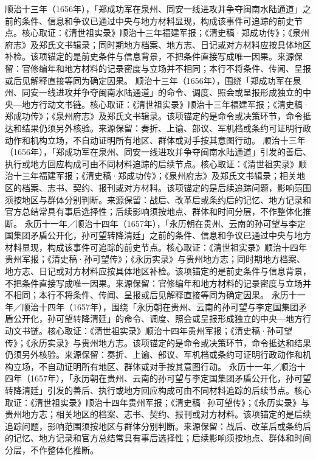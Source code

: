 顺治十三年（1656年），「郑成功军在泉州、同安一线进攻并争夺闽南水陆通道」之前的条件、信息和争议已通过中央与地方材料显现，构成该事件可追踪的前史节点。核心取证：《清世祖实录》顺治十三年福建军报；《清史稿·郑成功传》；《泉州府志》及郑氏文书辑录；同时期地方档案、地方志、日记或对方材料应按具体地区补检。该项锚定的是前史条件与信息背景，不把条件直接写成唯一因果。来源保留：官修编年和地方材料的记录密度与立场并不相同；本行不将条件、传闻、呈报或后见解释直接等同为确定因果。
顺治十三年（1656年），围绕「郑成功军在泉州、同安一线进攻并争夺闽南水陆通道」的命令、调度、照会或呈报形成独立的中央—地方行动文书链。核心取证：《清世祖实录》顺治十三年福建军报；《清史稿·郑成功传》；《泉州府志》及郑氏文书辑录。该项锚定的是命令或决策环节，命令抵达和结果仍须另外核验。来源保留：奏折、上谕、部议、军机档或条约可证明行政动作和机构立场，不自动证明所有地区、群体或对手按其意图行动。
顺治十三年（1656年），「郑成功军在泉州、同安一线进攻并争夺闽南水陆通道」引发的善后、执行或地方回应构成可由不同材料追踪的后续节点。核心取证：《清世祖实录》顺治十三年福建军报；《清史稿·郑成功传》；《泉州府志》及郑氏文书辑录；相关地区的档案、志书、契约、报刊或对方材料。该项锚定的是后续追踪问题，影响范围须按地区与群体分别判断。来源保留：战后、改革后或条约后的记忆、地方记录和官方总结常具有事后选择性；后续影响须按地点、群体和时间分层，不作整体化推断。
永历十一年／顺治十四年（1657年），「永历朝在贵州、云南的孙可望与李定国集团矛盾公开化，孙可望转降清廷」之前的条件、信息和争议已通过中央与地方材料显现，构成该事件可追踪的前史节点。核心取证：《清世祖实录》顺治十四年贵州军报；《清史稿·孙可望传》；《永历实录》与贵州地方志；同时期地方档案、地方志、日记或对方材料应按具体地区补检。该项锚定的是前史条件与信息背景，不把条件直接写成唯一因果。来源保留：官修编年和地方材料的记录密度与立场并不相同；本行不将条件、传闻、呈报或后见解释直接等同为确定因果。
永历十一年／顺治十四年（1657年），围绕「永历朝在贵州、云南的孙可望与李定国集团矛盾公开化，孙可望转降清廷」的命令、调度、照会或呈报形成独立的中央—地方行动文书链。核心取证：《清世祖实录》顺治十四年贵州军报；《清史稿·孙可望传》；《永历实录》与贵州地方志。该项锚定的是命令或决策环节，命令抵达和结果仍须另外核验。来源保留：奏折、上谕、部议、军机档或条约可证明行政动作和机构立场，不自动证明所有地区、群体或对手按其意图行动。
永历十一年／顺治十四年（1657年），「永历朝在贵州、云南的孙可望与李定国集团矛盾公开化，孙可望转降清廷」引发的善后、执行或地方回应构成可由不同材料追踪的后续节点。核心取证：《清世祖实录》顺治十四年贵州军报；《清史稿·孙可望传》；《永历实录》与贵州地方志；相关地区的档案、志书、契约、报刊或对方材料。该项锚定的是后续追踪问题，影响范围须按地区与群体分别判断。来源保留：战后、改革后或条约后的记忆、地方记录和官方总结常具有事后选择性；后续影响须按地点、群体和时间分层，不作整体化推断。
